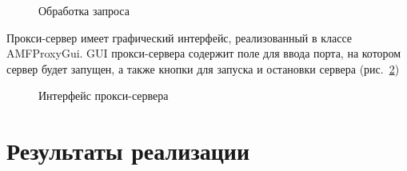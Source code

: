 \begin{figure}[ht]
\caption{Обработка запроса}
\label{ris:Diagram1.png}
\end{figure}

Прокси-сервер имеет графический интерфейс, реализованный в классе AMFProxyGui. GUI прокси-сервера содержит поле для
ввода порта, на котором сервер будет запущен, а также кнопки для запуска и остановки сервера (рис.~\ref{ris:proxySettings1.png})

\begin{figure}[ht]
\caption{Интерфейс прокси-сервера}
\label{ris:proxySettings1.png}
\end{figure}

\section{Результаты реализации}

